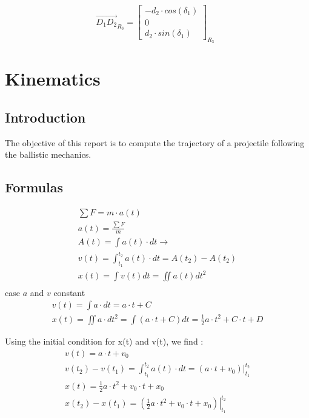 \documentclass[12pt,a4paper]{article}
\begin{document}
\begin{equation}
	\vec{D_1 D_2}_{R_3}=
	\begin{bmatrix}
		-d_2 \cdot cos(\delta_1)\\
		0\\
		d_2 \cdot sin(\delta_1)
	\end{bmatrix}_{R_3} \enspace
\end{equation}


\section{Kinematics}


\subsection{Introduction}

The objective of this report is to compute the trajectory of a projectile following the ballistic mechanics. 

\subsection{Formulas}


\begin{eqnarray}
	\sum F = m \cdot a(t)\\
	a(t) = \frac{\sum F}{m}\\
	A(t) = \int a(t) \cdot dt \rightarrow\\
	v(t) = \int_{t_1}^{t_2} a(t) \cdot dt = A(t_2) - A(t_2) \\
	x(t) = \int v(t) dt = \iint a(t) dt^2\\
\end{eqnarray}
case $a$ and $v$ constant 
\begin{eqnarray}
	v(t) = \int a \cdot dt = a \cdot t + C\\
	x(t) = \iint a \cdot dt^2 = \int (a \cdot t + C ) dt =  \frac{1}{2} a \cdot t^2 + C \cdot t + D
\end{eqnarray}

Using the initial condition for x(t) and v(t), we find : 
\begin{eqnarray}
	v(t) = a \cdot t + v_0\\
	v(t_2) - v(t_1) = \int_{t_1}^{t_2} a(t) \cdot dt = \left.(a \cdot t  + v_0) \right\vert_{t_1}^{t_2}\\
	x(t) = \frac{1}{2} a \cdot t^2 + v_0 \cdot t + x_0\\
	x(t_2) - x(t_1) = \left.(\frac{1}{2} a \cdot t^2 + v_0 \cdot t + x_0)\right\vert_{t_1}^{t_2}
\end{eqnarray}
\end{document}

